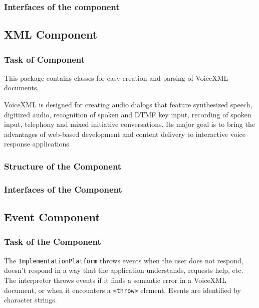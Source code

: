 \documentclass[11pt,a4paper]{article}
\begin{document}
\subsubsection{Interfaces of the component}

\subsection{XML Component}
\label{sec:xml-component}

\subsubsection{Task of Component}

This package contains classes for easy creation and parsing of VoiceXML
documents.

VoiceXML is designed for creating audio dialogs that feature synthesized
speech, digitized audio, recognition of spoken and DTMF key input, recording
of spoken input, telephony and mixed initiative conversations. Its major goal
is to bring the advantages of web-based development and content delivery to
interactive voice response applications.

\subsubsection{Structure of the Component}


\subsubsection{Interfaces of the Component}

\subsection{Event Component}
\label{sec:event-component}

\subsubsection{Task of the Component}

The \texttt{ImplementationPlatform} throws events when the user does not 
respond, doesn't respond in a way that the application understands, requests 
help, etc. The interpreter
throws events if it finds a semantic error in a VoiceXML document, or when it
encounters a \texttt{<throw>} element. Events are identified by
character strings.
\end{document}
